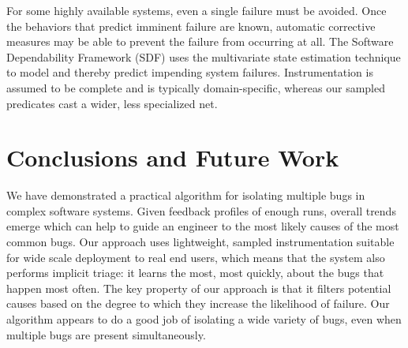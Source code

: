 \documentclass[draft]{sig-alternate}
\newcommand{\comment}[1]{}
\begin{document}
\comment{More recent work of interest:

  \begin{itemize}
  \item S.\ Elbaum, S.\ Kanduri and A.\ Andrews, ``Anomalies as
    Precursors of Field Failures, International Symposium of Software
    Reliability Engineering'', IEEE, November 2003.

  \item S.\ Elbaum and M.\ Hardojo, ``An Empirical Study on Profiling
    Strategies for Released Software and Their Application to QA
    Activities'', Technical Report TR03-09-01, University of Nebraska
    - Lincoln, September 2003.
  \end{itemize}

  Cannot find either online, but have written to Elbaum asking him for
  copies.}

For some highly available systems, even a single failure must be
avoided.  Once the behaviors that predict imminent failure are known,
automatic corrective measures may be able to prevent the failure from
occurring at all.  The Software Dependability Framework (SDF)
\cite{Gross:2003:PSMUST} uses the multivariate state estimation
technique to model and thereby predict impending system failures.
Instrumentation is assumed to be complete and is typically
domain-specific, whereas our sampled predicates cast a wider, less
specialized net.  \comment{We understand through informal
  communication that the SDF is able to anticipate when a player is
  about to lose an instrumented game of Tetris, and can intervene by
  removing rows to allow the game to continue.  But maybe I shouldn't
  say that, as it kind of makes their system sound like a joke.}

\comment{Cannot find any more recent work by these people in this
  area.  Where did they all go?  Porter has plenty of other recent
  work, but apparently nothing related.  Gross and McMaster have zero
  publication information on their home pages, while Umranov and Votta
  seem to have vanished entirely.  Have written to Gross and Porter
  asking if they have anything more recent I should look at.}

\section{Conclusions and Future Work}
\label{sec:conclusions}

We have demonstrated a practical algorithm for isolating multiple bugs
in complex software systems.  Given feedback profiles of enough runs,
overall trends emerge which can help to guide an engineer to the most
likely causes of the most common bugs.  Our approach uses lightweight,
sampled instrumentation suitable for wide scale deployment to real end
users, which means that the system also performs implicit triage: it
learns the most, most quickly, about the bugs that happen most often.
The key property of our approach is that it filters potential causes
based on the degree to which they increase the likelihood of failure.
Our algorithm appears to do a good job of isolating a wide variety of
bugs, even when multiple bugs are present simultaneously.
\end{document}
